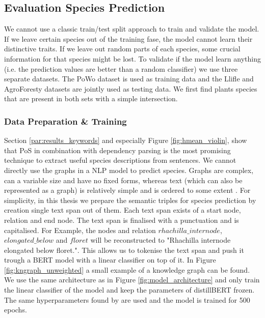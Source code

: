 \documentclass[a4paper, 12pt, oneside]{book} %
\begin{document}
\subsection{Evaluation Species Prediction} \label{par:species_prediction}
We cannot use a classic train/test split approach to train and validate the model.
If we leave certain species out of the training fase, the model cannot learn their distinctive traits.
If we leave out random parts of each species, some crucial information for that species might be lost.
To validate if the model learn anything (i.e. the prediction values are better than a random classifier) we use three separate datasets.
The PoWo dataset is used as training data and the Llifle and AgroForesty datasets are jointly used as testing data.
We first find plants species that are present in both sets with a simple intersection.


\subsubsection{Data Preparation \& Training} \label{par:pos_training}
Section \ref{par:results_keywords} and especially Figure \ref{fig:hmean_violin}, show that PoS in combination with dependency parsing is the most promising technique to extract useful species descriptions from sentences.
We cannot directly use the graphs in a NLP model to predict species.
Graphs are complex, can a variable size and have no fixed forms, whereas text (which can also be represented as a graph) is relatively simple and is ordered to some extent \autocite{sanchez-lengeling_gentle_2021}. 
For simplicity, in this thesis we prepare the semantic triples for species prediction by creation single text span out of them.
Each text span exists of a start node, relation and end node.
The text span is finalised with a punctuation and is capitalised.
For Example, the nodes and relation $rhachilla\_internode$, $elongated\_below$ and $floret$ will be reconstructed to "Rhachilla internode elongated below floret.".
This allows us to tokenise the text span and push it trough a BERT model with a linear classifier on top of it.
In Figure \ref{fig:kngraph_unweighted} a small example of a knowledge graph can be found.
We use the same architecture as in Figure \ref{fig:model_architecture} and only train the linear classifier of the model and keep the parameters of distillBERT frozen.
The same hyperparameters found by \textcite{sun_how_2020} are used and the model is trained for 500 epochs.
\end{document}
